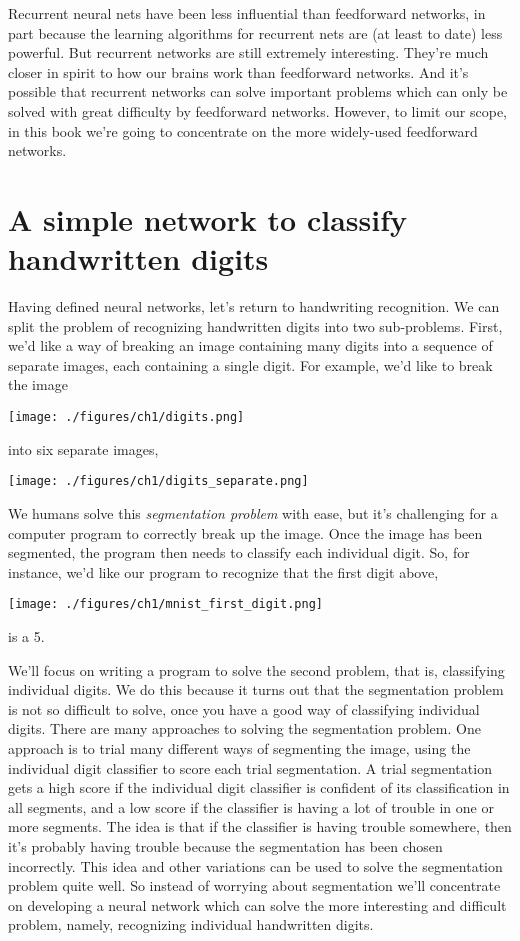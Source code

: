 \documentclass[a4paper,twoside,10pt]{book}
\begin{document}
Recurrent neural nets have been less influential than feedforward networks, in part because the learning algorithms for recurrent nets are (at least to date) less powerful. But recurrent networks are still extremely interesting. They're much closer in spirit to how our brains work than feedforward networks. And it's possible that recurrent networks can solve important problems which can only be solved with great difficulty by feedforward networks. However, to limit our scope, in this book we're going to concentrate on the more widely-used feedforward networks.

\section{A simple network to classify handwritten digits}
Having defined neural networks, let's return to handwriting recognition. We can split the problem of recognizing handwritten digits into two sub-problems. First, we'd like a way of breaking an image containing many digits into a sequence of separate images, each containing a single digit. For example, we'd like to break the image
\begin{center}
	\texttt{[image: ./figures/ch1/digits.png]}
\end{center}
into six separate images,
\begin{center}
	\texttt{[image: ./figures/ch1/digits\_separate.png]}
\end{center}
We humans solve this \textit{segmentation problem} with ease, but it's challenging for a computer program to correctly break up the image. Once the image has been segmented, the program then needs to classify each individual digit. So, for instance, we'd like our program to recognize that the first digit above,
\begin{center}
	\texttt{[image: ./figures/ch1/mnist\_first\_digit.png]}
\end{center}
is a 5.

We'll focus on writing a program to solve the second problem, that is, classifying individual digits. We do this because it turns out that the segmentation problem is not so difficult to solve, once you have a good way of classifying individual digits. There are many approaches to solving the segmentation problem. One approach is to trial many different ways of segmenting the image, using the individual digit classifier to score each trial segmentation. A trial segmentation gets a high score if the individual digit classifier is confident of its classification in all segments, and a low score if the classifier is having a lot of trouble in one or more segments. The idea is that if the classifier is having trouble somewhere, then it's probably having trouble because the segmentation has been chosen incorrectly. This idea and other variations can be used to solve the segmentation problem quite well. So instead of worrying about segmentation we'll concentrate on developing a neural network which can solve the more interesting and difficult problem, namely, recognizing individual handwritten digits.
\end{document}
